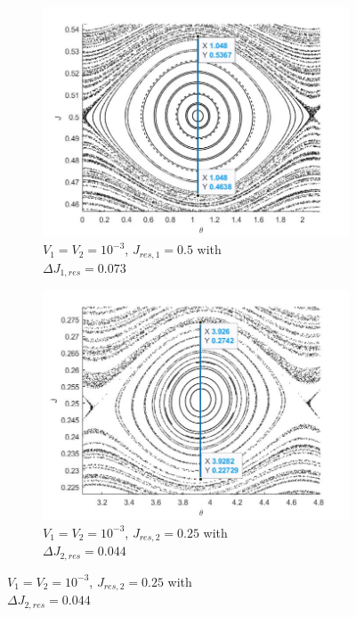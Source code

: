 \begin{figure}[hb!]
\begin{subfigure}{.5\textwidth}
  		\label{fig2.10b}
	\end{subfigure}%
	        \\
	\begin{subfigure}{.49\textwidth}
  		\includegraphics[scale=0.3,left]{Hamiltonian_1/numerical/figs/Q5_dj_1e-3_res1}
  		\caption{$V_1=V_2=10^{-3}$, $J_{res,1}=0.5$ with \\$\Delta J_{1,res}=0.073$}
  		\label{fig2.10c}
	\end{subfigure}
	\begin{subfigure}{.49\textwidth}
  		\includegraphics[scale=0.3,right]{Hamiltonian_1/numerical/figs/Q5_dj_1e-3_res2}
  		\caption{$V_1=V_2=10^{-3}$, $J_{res,2}=0.25$ with \\$\Delta J_{2,res}=0.044$}

\end{subfigure}
\end{figure}
